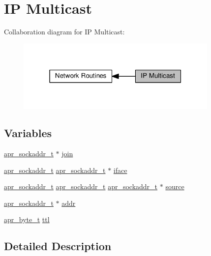 \hypertarget{group__apr__mcast}{}\section{IP Multicast}
\label{group__apr__mcast}
Collaboration diagram for IP Multicast\+:
\nopagebreak
\begin{figure}[H]
\begin{center}
\leavevmode
\includegraphics[width=280pt]{group__apr__mcast}
\end{center}
\end{figure}
\subsection*{Variables}
\begin{DoxyCompactItemize}
\item 
\hyperlink{structapr__sockaddr__t}{apr\+\_\+sockaddr\+\_\+t} $\ast$ \hyperlink{group__apr__mcast_ga2d95afe63c78661afb200a75da9ae794}{join}
\item 
\hyperlink{structapr__sockaddr__t}{apr\+\_\+sockaddr\+\_\+t} \hyperlink{structapr__sockaddr__t}{apr\+\_\+sockaddr\+\_\+t} $\ast$ \hyperlink{group__apr__mcast_ga723508cfed79f6d0c8b49717f7e56178}{iface}
\item 
\hyperlink{structapr__sockaddr__t}{apr\+\_\+sockaddr\+\_\+t} \hyperlink{structapr__sockaddr__t}{apr\+\_\+sockaddr\+\_\+t} \hyperlink{structapr__sockaddr__t}{apr\+\_\+sockaddr\+\_\+t} $\ast$ \hyperlink{group__apr__mcast_ga9b1b80407da58f6c0654348c017710eb}{source}
\item 
\hyperlink{structapr__sockaddr__t}{apr\+\_\+sockaddr\+\_\+t} $\ast$ \hyperlink{group__apr__mcast_gaf32a3eae6659774e82d8fc61ebc0169d}{addr}
\item 
\hyperlink{group__apr__platform_gadcfa334915b4605a0052cb4ca542eb3a}{apr\+\_\+byte\+\_\+t} \hyperlink{group__apr__mcast_gaecc55bc3d317d868b03f6b7136d66f36}{ttl}
\end{DoxyCompactItemize}


\subsection{Detailed Description}



